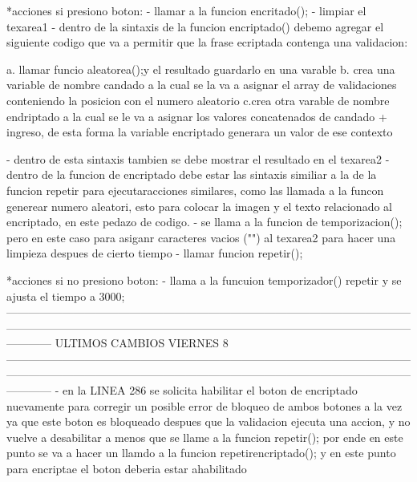              *acciones si presiono boton:
                  - llamar a la funcion encritado();
                  - limpiar el texarea1
                  - dentro de la sintaxis de la funcion encriptado() debemo agregar el siguiente codigo que va a permitir que la frase ecriptada contenga una validacion:

                      a. llamar funcio aleatorea();y el resultado guardarlo en una varable
                      b. crea una variable de nombre candado a la cual se la va a asignar el array de validaciones conteniendo la posicion con el numero aleatorio
                      c.crea otra varable de nombre endriptado a la cual se le va a asignar los valores concatenados de candado + ingreso, de esta forma la variable encriptado generara un valor de ese contexto

                  - dentro de esta sintaxis tambien se debe mostrar el resultado en el texarea2
                  - dentro de la funcion de encriptado debe estar las sintaxis similiar a la de la funcion repetir para ejecutaracciones similares, como las llamada a la funcon generear numero aleatori, esto para colocar la imagen y el texto relacionado al encriptado, en este pedazo de codigo.
                  - se llama a la  funcion de temporizacion(); pero en este caso para asiganr caracteres vacios ("")  al texarea2 para hacer una limpieza despues de cierto tiempo
                  - llamar funcion repetir();

              *acciones si no presiono boton:
                    - llama a la funcuion temporizador() repetir y se ajusta el tiempo a 3000;
------------------------------------------------------------------------------------------------------------------------------------------------------------------------------------------------------------------------------------
                                                         ULTIMOS CAMBIOS VIERNES 8
------------------------------------------------------------------------------------------------------------------------------------------------------------------------------------------------------------------------------------
            - en la LINEA 286 se solicita habilitar el boton de encriptado nuevamente para corregir un posible error de bloqueo de ambos botones a la vez 
            ya que este boton es bloqueado despues que la validacion ejecuta una accion, y no vuelve a desabilitar a menos que se llame a la funcion repetir();
            por ende en este punto se va a hacer un llamdo a la funcion repetirencriptado(); y en este punto para encriptae el boton deberia estar ahabilitado 
            
